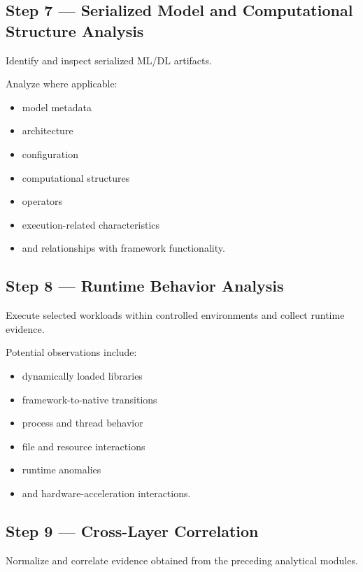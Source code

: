 \documentclass[
  12pt,
  letterpaper,
  oneside]{report}
\providecommand{\tightlist}{%
  \setlength{\itemsep}{0pt}\setlength{\parskip}{0pt}}
\begin{document}
\subsection{Step 7 --- Serialized Model and Computational Structure
Analysis}\label{step-7--serialized-model-and-computational-structure-analysis}

Identify and inspect serialized ML/DL artifacts.

Analyze where applicable:

\begin{itemize}
\tightlist
\item
  model metadata
\item
  architecture
\item
  configuration
\item
  computational structures
\item
  operators
\item
  execution-related characteristics
\item
  and relationships with framework functionality.
\end{itemize}

\subsection{Step 8 --- Runtime Behavior
Analysis}\label{step-8--runtime-behavior-analysis}

Execute selected workloads within controlled environments and collect
runtime evidence.

Potential observations include:

\begin{itemize}
\tightlist
\item
  dynamically loaded libraries
\item
  framework-to-native transitions
\item
  process and thread behavior
\item
  file and resource interactions
\item
  runtime anomalies
\item
  and hardware-acceleration interactions.
\end{itemize}

\subsection{Step 9 --- Cross-Layer
Correlation}\label{step-9--cross-layer-correlation}

Normalize and correlate evidence obtained from the preceding analytical
modules.
\end{document}
